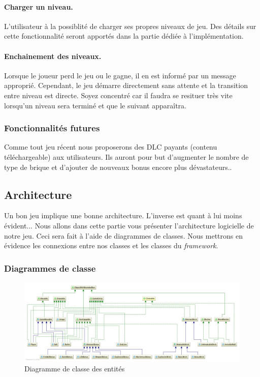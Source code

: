 \documentclass[a4paper,10pt]{article}
\begin{document}
		\paragraph{Charger un niveau.} L'utilisateur à la possiblité de charger ses propres niveaux de jeu. Des détails sur
		cette fonctionnalité seront apportés dans la partie dédiée à l'implémentation.

        \paragraph{Enchainement des niveaux. } Lorsque le joueur perd le jeu ou le gagne, il en est informé par un message approprié. Cependant, le jeu démarre
        directement sans attente et la transition entre niveau est directe. Soyez concentré car il faudra
        se resituer très vite lorsqu'un niveau sera terminé et que le suivant apparaîtra.

	\subsubsection{Fonctionnalités futures}
		Comme tout jeu récent nous proposerons des DLC payants (contenu téléchargeable) aux utilisateurs. Ils auront pour but
		d'augmenter le nombre de type de brique et d'ajouter de nouveaux bonus encore plus dévastateurs..

\subsection{Architecture}
    Un bon jeu implique une bonne architecture. L'inverse est quant à lui moins évident...
	Nous allons dans cette partie vous présenter l'architecture logicielle de notre jeu. Ceci sera fait à l'aide de
	diagrammes de classes.
	Nous mettrons en évidence les connexions entre nos classes et les classes du \textit{framework}.

	\subsubsection{Diagrammes de classe}

		\FloatBarrier
		\begin{figure}[!h]
    		\begin{center}
	  	  	\includegraphics[scale=0.17]{images/whiteEntityDiagram.jpg}
          	\caption{Diagramme de classe des entités}
    		\end{center}
		\end{figure}
		\FloatBarrier
\end{document}

